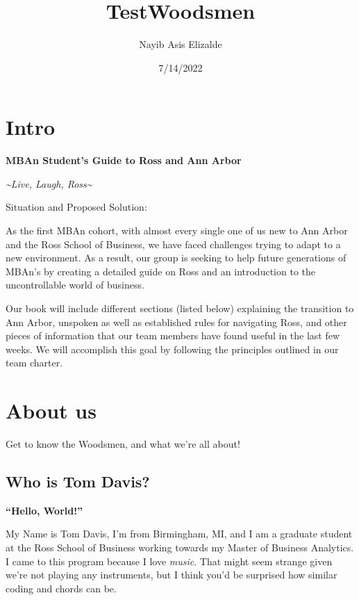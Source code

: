 \documentclass[
]{book}
\title{TestWoodsmen}
\author{Nayib Asis Elizalde}
\date{7/14/2022}
\begin{document}
\maketitle

{
\setcounter{tocdepth}{1}
\tableofcontents
}
\hypertarget{intro}{%
\chapter{Intro}\label{intro}}

\textbf{MBAn Student's Guide to Ross and Ann Arbor}

\emph{\textasciitilde Live, Laugh, Ross\textasciitilde{}}

Situation and Proposed Solution:

As the first MBAn cohort, with almost every single one of us new to Ann Arbor and the Ross School of Business, we have faced challenges trying to adapt to a new environment. As a result, our group is seeking to help future generations of MBAn's by creating a detailed guide on Ross and an introduction to the uncontrollable world of business.

Our book will include different sections (listed below) explaining the transition to Ann Arbor, unspoken as well as established rules for navigating Ross, and other pieces of information that our team members have found useful in the last few weeks. We will accomplish this goal by following the principles outlined in our team charter.

\hypertarget{about-us}{%
\chapter{About us}\label{about-us}}

Get to know the Woodsmen, and what we're all about!

\hypertarget{who-is-tom-davis}{%
\section{Who is Tom Davis?}\label{who-is-tom-davis}}

\textbf{``Hello, World!''}

My Name is Tom Davis, I'm from Birmingham, MI, and I am a graduate student at the Ross School of Business working towards my Master of Business Analytics. I came to this program because I love \emph{music}. That might seem strange given we're not playing any instruments, but I think you'd be surprised how similar coding and chords can be.
\end{document}
